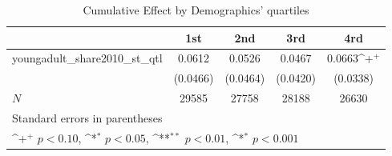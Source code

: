 \begin{table}[htbp]\centering
\def\sym#1{\ifmmode^{#1}\else\(^{#1}\)\fi}
\caption{Cumulative Effect by Demographics' quartiles}
\begin{tabular}{l*{4}{c}}
\hline\hline
            &\multicolumn{1}{c}{1st}&\multicolumn{1}{c}{2nd}&\multicolumn{1}{c}{3rd}&\multicolumn{1}{c}{4rd}\\
\hline
youngadult\_share2010\_st\_qtl&      0.0612       &      0.0526       &      0.0467       &      0.0663\sym{+}\\
            &    (0.0466)       &    (0.0464)       &    (0.0420)       &    (0.0338)       \\
\hline
\(N\)       &       29585       &       27758       &       28188       &       26630       \\
\hline\hline
\multicolumn{5}{l}{\footnotesize Standard errors in parentheses}\\
\multicolumn{5}{l}{\footnotesize \sym{+} \(p<0.10\), \sym{*} \(p<0.05\), \sym{**} \(p<0.01\), \sym{*} \(p<0.001\)}\\
\end{tabular}
\end{table}
